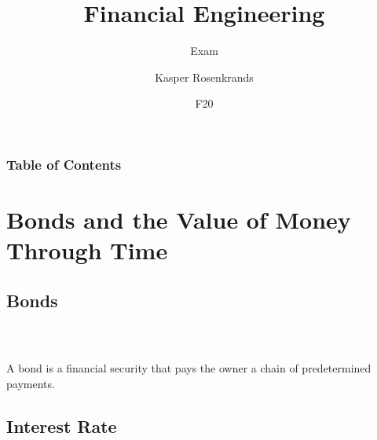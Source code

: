 \documentclass{beamer}
\title{Financial Engineering}
\subtitle{Exam}
\author{Kasper Rosenkrands}
\institute{Aalborg University}
\date{F20}
\numberwithin{equation}{section}
\begin{document}
\frame{\titlepage}

\begin{frame}
\frametitle{Table of Contents}
\tableofcontents[hideallsubsections]
\end{frame}

\section{Bonds and the Value of Money Through Time}

\subsection{Bonds}

\begin{frame}\frametitle{{\normalsize \secname} \\ {\large \subsecname}}
    \begin{definition}[Bond]\label{def:bond}
        A bond is a financial security that pays the owner a chain of predetermined payments.
    \end{definition}
\end{frame}

%

\subsection{Interest Rate}
\end{document}
